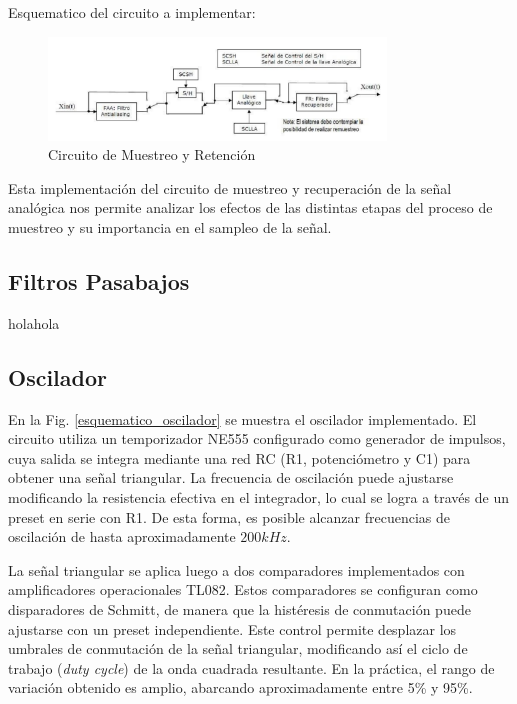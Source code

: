 Esquematico del circuito a implementar:

\begin{figure}[H]
    \centering
    \includegraphics[width=0.8\textwidth]{Imagenes/Circuito_Muestreo.png}
    \caption{Circuito de Muestreo y Retención}
    \label{fig:Circuito_Muestreo}
\end{figure}
Esta implementación del circuito de muestreo y recuperación de la señal analógica nos permite analizar 
los efectos de las distintas etapas del proceso de muestreo y su importancia en el sampleo de la señal.
\subsection{Filtros Pasabajos}
holahola

\subsection{Oscilador}
En la Fig. \ref{esquematico_oscilador} se muestra el oscilador implementado. El circuito utiliza un temporizador NE555 configurado como generador de impulsos, cuya salida se integra mediante una red RC (R1, potenciómetro y C1) para obtener una señal triangular. La frecuencia de oscilación puede ajustarse modificando la resistencia efectiva en el integrador, lo cual se logra a través de un preset en serie con R1. De esta forma, es posible alcanzar frecuencias de oscilación de hasta aproximadamente $200kHz$.

La señal triangular se aplica luego a dos comparadores implementados con amplificadores operacionales TL082. Estos comparadores se configuran como disparadores de Schmitt, de manera que la histéresis de conmutación puede ajustarse con un preset independiente. Este control permite desplazar los umbrales de conmutación de la señal triangular, modificando así el ciclo de trabajo (\textit{duty cycle}) de la onda cuadrada resultante. En la práctica, el rango de variación obtenido es amplio, abarcando aproximadamente entre 5\% y 95\%.

